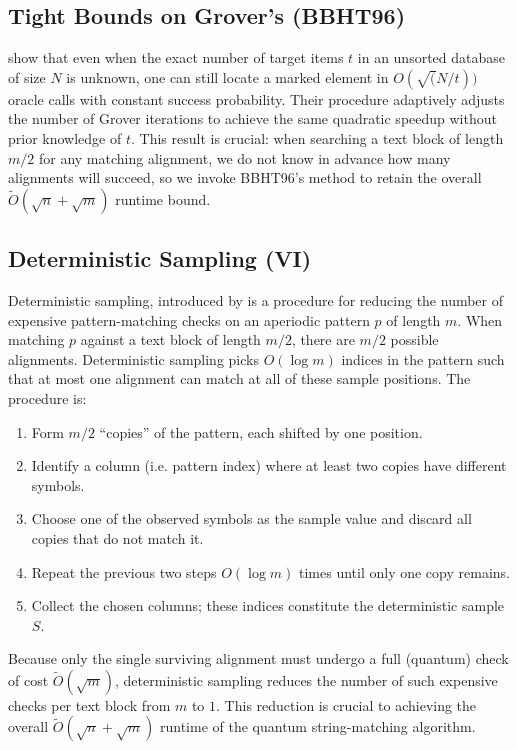 \documentclass[12pt]{IEEEtran}
\begin{document}
\subsection{Tight Bounds on Grover's (BBHT96)}
\cite[Boyer, Brassard, Høyer, and Tapp]{Boyer_1998} show that even when the exact number of target items \(t\) in an unsorted database of size \(N\) is unknown, one can still locate a marked element in \(O(\sqrt(N/t))\) oracle calls with constant success probability. Their procedure adaptively adjusts the number of Grover iterations to achieve the same quadratic speedup without prior knowledge of \(t\). This result is crucial: when searching a text block of length \(m/2\) for any matching alignment, we do not know in advance how many alignments will succeed, so we invoke BBHT96's method to retain the overall \(\widetilde{O}(\sqrt{n} + \sqrt{m})\) runtime bound.

\subsection{Deterministic Sampling (VI)}
Deterministic sampling, introduced by \cite[Vishkin]{10.1145/100216.100235} is a procedure for reducing the number of expensive pattern-matching checks on an aperiodic pattern \(p\) of length \(m\).  When matching \(p\) against a text block of length \(m/2\), there are \(m/2\) possible alignments.  Deterministic sampling picks \(O(\log m)\) indices in the pattern such that at most one alignment can match at all of these sample positions.  The procedure is:

\begin{enumerate}
    \item Form \(m/2\) ``copies'' of the pattern, each shifted by one position.
    \item Identify a column (i.e. pattern index) where at least two copies have different symbols.
    \item Choose one of the observed symbols as the sample value and discard all copies that do not match it.
    \item Repeat the previous two steps \(O(\log m)\) times until only one copy remains.
    \item Collect the chosen columns; these indices constitute the deterministic sample \(S\).
\end{enumerate}

Because only the single surviving alignment must undergo a full (quantum) check of cost \(\tilde O(\sqrt m)\), deterministic sampling reduces the number of such expensive checks per text block from \(m\) to \(1\).  This reduction is crucial to achieving the overall \(\widetilde{O}(\sqrt n + \sqrt m)\) runtime of the quantum string-matching algorithm.
\end{document}
